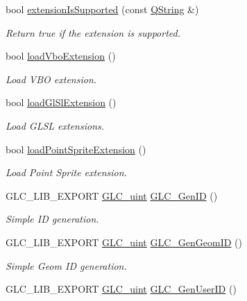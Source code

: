 \begin{DoxyCompactItemize}
\item 
bool \hyperlink{namespaceglc_ad4e22d4d9d929f199331be3ba9a6930d}{extension\-Is\-Supported} (const \hyperlink{group___u_a_v_objects_plugin_gab9d252f49c333c94a72f97ce3105a32d}{Q\-String} \&)
\begin{DoxyCompactList}\small\item\em Return true if the extension is supported. \end{DoxyCompactList}\item 
bool \hyperlink{namespaceglc_a49663af9b5cba95b73f41136be1fabb4}{load\-Vbo\-Extension} ()
\begin{DoxyCompactList}\small\item\em Load V\-B\-O extension. \end{DoxyCompactList}\item 
bool \hyperlink{namespaceglc_a204c813cbceaebabd51805fad054c270}{load\-Gl\-Sl\-Extension} ()
\begin{DoxyCompactList}\small\item\em Load G\-L\-S\-L extensions. \end{DoxyCompactList}\item 
bool \hyperlink{namespaceglc_a5343112041599c40abc0a5a5b5502de6}{load\-Point\-Sprite\-Extension} ()
\begin{DoxyCompactList}\small\item\em Load Point Sprite extension. \end{DoxyCompactList}\item 
G\-L\-C\-\_\-\-L\-I\-B\-\_\-\-E\-X\-P\-O\-R\-T \hyperlink{glc__global_8h_abf950976fabed69026558df8e2da6c6b}{G\-L\-C\-\_\-uint} \hyperlink{namespaceglc_a9f47ec67b32f9bcf13bdaa14755cfcfa}{G\-L\-C\-\_\-\-Gen\-I\-D} ()
\begin{DoxyCompactList}\small\item\em Simple I\-D generation. \end{DoxyCompactList}\item 
G\-L\-C\-\_\-\-L\-I\-B\-\_\-\-E\-X\-P\-O\-R\-T \hyperlink{glc__global_8h_abf950976fabed69026558df8e2da6c6b}{G\-L\-C\-\_\-uint} \hyperlink{namespaceglc_a977e15984be015dfe58e543d3d37196e}{G\-L\-C\-\_\-\-Gen\-Geom\-I\-D} ()
\begin{DoxyCompactList}\small\item\em Simple Geom I\-D generation. \end{DoxyCompactList}\item 
G\-L\-C\-\_\-\-L\-I\-B\-\_\-\-E\-X\-P\-O\-R\-T \hyperlink{glc__global_8h_abf950976fabed69026558df8e2da6c6b}{G\-L\-C\-\_\-uint} \hyperlink{namespaceglc_a32b099b4e7a776e0fd9539a3a6153751}{G\-L\-C\-\_\-\-Gen\-User\-I\-D} ()

\end{DoxyCompactItemize}
